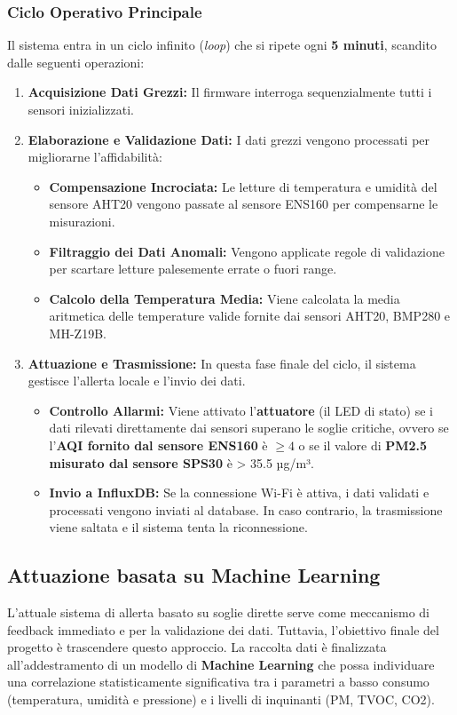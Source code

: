 \documentclass[fleqn,10pt]{SelfArx} %
\begin{document}
\subsubsection{Ciclo Operativo Principale}
Il sistema entra in un ciclo infinito (\textit{loop}) che si ripete ogni \textbf{5 minuti}, scandito dalle seguenti operazioni:
\begin{enumerate}
	\item \textbf{Acquisizione Dati Grezzi:} Il firmware interroga sequenzialmente tutti i sensori inizializzati.
	
	\item \textbf{Elaborazione e Validazione Dati:} I dati grezzi vengono processati per migliorarne l'affidabilità:
	\begin{itemize}
		\item \textbf{Compensazione Incrociata:} Le letture di temperatura e umidità del sensore AHT20 vengono passate al sensore ENS160 per compensarne le misurazioni.
		\item \textbf{Filtraggio dei Dati Anomali:} Vengono applicate regole di validazione per scartare letture palesemente errate o fuori range.
		\item \textbf{Calcolo della Temperatura Media:} Viene calcolata la media aritmetica delle temperature valide fornite dai sensori AHT20, BMP280 e MH-Z19B.
	\end{itemize}
	
	\item \textbf{Attuazione e Trasmissione:} In questa fase finale del ciclo, il sistema gestisce l'allerta locale e l'invio dei dati.
	\begin{itemize}
		\item \textbf{Controllo Allarmi:} Viene attivato l'\textbf{attuatore} (il LED di stato) se i dati rilevati direttamente dai sensori superano le soglie critiche, ovvero se l'\textbf{AQI fornito dal sensore ENS160} è $\ge 4$ o se il valore di \textbf{PM2.5 misurato dal sensore SPS30} è > 35.5 µg/m³.
		\item \textbf{Invio a InfluxDB:} Se la connessione Wi-Fi è attiva, i dati validati e processati vengono inviati al database. In caso contrario, la trasmissione viene saltata e il sistema tenta la riconnessione.
	\end{itemize}
\end{enumerate}

\subsection{Attuazione basata su Machine Learning}
L'attuale sistema di allerta basato su soglie dirette serve come meccanismo di feedback immediato e per la validazione dei dati. Tuttavia, l'obiettivo finale del progetto è trascendere questo approccio. La raccolta dati è finalizzata all'addestramento di un modello di \textbf{Machine Learning} che possa individuare una correlazione statisticamente significativa tra i parametri a basso consumo (temperatura, umidità e pressione) e i livelli di inquinanti (PM, TVOC, CO2).
\end{document}

